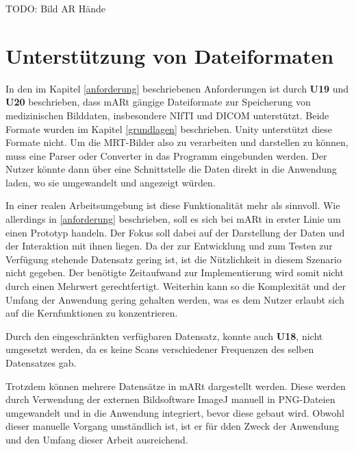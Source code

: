TODO: 
Bild AR Hände


\section{Unterstützung von Dateiformaten} 

In den im Kapitel \ref{anforderung} beschriebenen Anforderungen ist durch \textbf{U19} und \textbf{U20} beschrieben, dass mARt gängige Dateiformate zur Speicherung von medizinischen Bilddaten, insbesondere NIfTI und DICOM unterstützt. Beide Formate wurden im Kapitel \ref{grundlagen} beschrieben. 
Unity unterstützt diese Formate nicht. Um die MRT-Bilder also zu verarbeiten und darstellen zu können, muss eine Parser oder Converter in das Programm eingebunden werden. 
Der Nutzer könnte dann über eine Schnittstelle die Daten direkt in die Anwendung laden, wo sie umgewandelt und angezeigt würden. 

In einer realen Arbeitsumgebung ist diese Funktionalität mehr als sinnvoll. Wie allerdings in \ref{anforderung} beschrieben, soll es sich bei mARt in erster Linie um einen Prototyp handeln.
Der Fokus soll dabei auf der Darstellung der Daten und der Interaktion mit ihnen liegen. Da der zur Entwicklung und zum Testen zur Verfügung stehende Datensatz gering ist, ist die Nützlichkeit in diesem Szenario nicht gegeben. Der benötigte Zeitaufwand zur Implementierung wird somit nicht durch einen Mehrwert gerechtfertigt.
Weiterhin kann so die Komplexität und der Umfang der Anwendung gering gehalten werden, was es dem Nutzer erlaubt sich auf die Kernfunktionen zu konzentrieren. 

Durch den eingeschränkten verfügbaren Datensatz, konnte auch \textbf{U18}, nicht umgesetzt werden, da es keine Scans verschiedener Frequenzen des selben Datensatzes gab.

Trotzdem können mehrere Datensätze in mARt dargestellt werden. Diese werden durch Verwendung der externen Bildsoftware ImageJ manuell in PNG-Dateien umgewandelt und in die Anwendung integriert, bevor diese gebaut wird. 
Obwohl dieser manuelle Vorgang umständlich ist, ist er für dden Zweck der Anwendung und den Umfang dieser Arbeit ausreichend.
